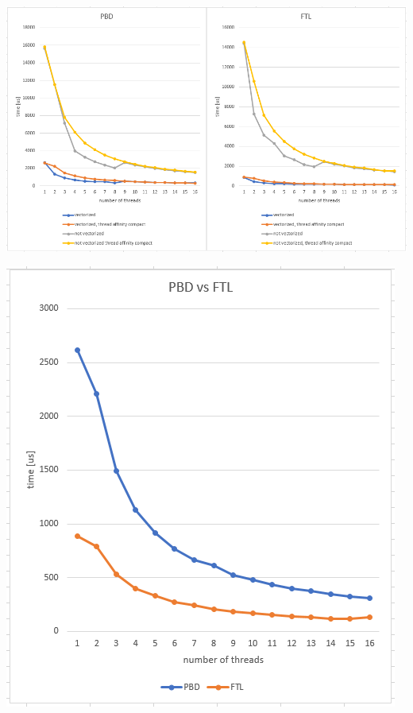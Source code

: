 \documentclass[
paper=192mm:144mm, %
fontsize=12pt, %
pagesize, %
parskip=half-, %
]{scrartcl} %
\theoremstyle{mythmstyle} %
\begin{document}
\begin{center}
\begin{framed}
\includegraphics[scale=0.6]{Bilder/4.png}
\end{framed}
\end{center}


\clearpage


\begin{center}
\includegraphics[scale=0.65]{Bilder/5.png}
\end{center}
\end{document}
